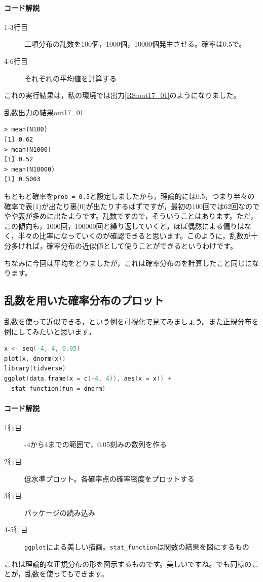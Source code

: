 \documentclass{ltjsbook}
\begin{document}
\paragraph{コード解説}
\begin{description}
        \item[1-3行目] 二項分布の乱数を100個，1000個，10000個発生させる。確率は0.5で。
        \item[4-6行目] それぞれの平均値を計算する
\end{description}
これの実行結果は，私の環境では出力\ref{RS:out17_01}のようになりました。
\begin{Rscreen}{乱数出力の結果}{out17_01}
    \begin{verbatim}
> mean(N100)
[1] 0.62
> mean(N1000)
[1] 0.52
> mean(N10000)
[1] 0.5003\end{verbatim}
\end{Rscreen}

もともと確率を\texttt{prob = 0.5}と設定しましたから，理論的には0.5，つまり半々の確率で表($1$)が出たり裏($0$)が出たりするはずですが，最初の100回では62回なのでやや表が多めに出たようです。乱数ですので，そういうことはあります。ただ，この傾向も，1000回，100000回と繰り返していくと，ほぼ偶然による偏りはなく，半々の比率になっていくのが確認できると思います。このように，乱数が十分多ければ，確率分布の近似値として使うことができるというわけです。

ちなみに今回は平均をとりましたが，これは確率分布のを計算したこと同じになります。
\subsection{乱数を用いた確率分布のプロット}
乱数を使って近似できる，という例を可視化で見てみましょう。また正規分布を例にしてみたいと思います。
\begin{lstlisting}[language=c++,label={code::17_04},caption={確率分布の可視化1}]
x <- seq(-4, 4, 0.05)
plot(x, dnorm(x))
library(tidverse)
ggplot(data.frame(x = c(-4, 4)), aes(x = x)) +
  stat_function(fun = dnorm)
\end{lstlisting}
\paragraph{コード解説}
    \begin{description}
        \item[1行目] -4から4までの範囲で，0.05刻みの数列を作る
        \item[2行目] 低水準プロット。各確率点の確率密度をプロットする
        \item[3行目] パッケージの読み込み
        \item[4-5行目] \texttt{ggplot}による美しい描画。\verb|stat_function|は関数の結果を図にするもの
\end{description}
これは理論的な正規分布の形を図示するものです。美しいですね。でも同様のことが，乱数を使ってもできます。
\end{document}
